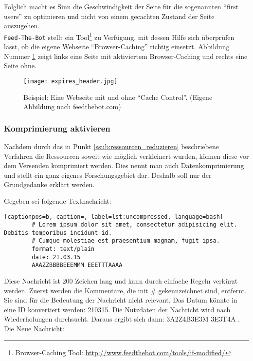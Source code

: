 				Folglich macht es Sinn die Geschwindigkeit der Seite für die sogenannten "`first users"' zu optimieren und nicht von einem gecachten Zustand der Seite auszugehen.\\
				\texttt{Feed-The-Bot} stellt ein Tool\footnote{Browser-Caching Tool: \url{http://www.feedthebot.com/tools/if-modified/}} zu Verfügung, mit dessen Hilfe sich überprüfen lässt, ob die eigene Webseite "`Browser-Caching"' richtig einsetzt. Abbildung Nummer \ref{fig:expires_header} zeigt links eine Seite mit aktiviertem Browser-Caching und rechts eine Seite ohne.
			  \begin{figure}[htbp]
			  	\begin{center}
			  		\texttt{[image: expires\_header.jpg]}
			  		\caption{Beispiel: Eine Webseite mit und ohne "`Cache Control"'. (Eigene Abbildung nach feedthebot.com)}
			  		\label{fig:expires_header}
			  	\end{center}
			  \end{figure}
			\pagebreak

			\subsubsection{Komprimierung aktivieren} %
			\label{ssub:komprimierung_aktivieren}
				Nachdem durch das in Punkt \ref{ssub:ressourcen_reduzieren} beschriebene Verfahren die Ressourcen soweit wie möglich verkleinert wurden, können diese vor dem Versenden komprimiert werden. Dies nennt man auch Datenkomprimierung und stellt ein ganz eigenes Forschungsgebiet dar. Deshalb soll nur der Grundgedanke erklärt werden.

				Gegeben sei folgende Textnachricht:
				\begin{lstlisting}[captionpos=b, caption=, label=lst:uncompressed, language=bash]
		# Lorem ipsum dolor sit amet, consectetur adipisicing elit. Debitis temporibus incidunt id.
		# Cumque molestiae est praesentium magnam, fugit ipsa.
		format: text/plain
		date: 21.03.15
		AAAZZBBBBEEEMMM EEETTTAAAA
				\end{lstlisting}

				Diese Nachricht ist 200 Zeichen lang und kann durch einfache Regeln verkürzt werden. Zuerst werden die Kommentare, die mit \# gekennzeichnet sind, entfernt. Sie sind für die Bedeutung der Nachricht nicht relevant. Das Datum könnte in eine ID konvertiert werden: 210315. Die Nutzdaten der Nachricht wird nach Wiederholungen durchsucht. Daraus ergibt sich dann: 3A2Z4B3E3M 3E3T4A \autocite{grigorikGzip}. Die Neue Nachricht:

